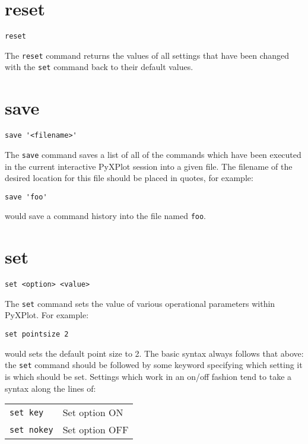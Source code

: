 \section{reset}

\begin{verbatim}
reset
\end{verbatim}

The {\tt reset} command returns the values of all settings that have been
changed with the {\tt set} command back to their default values.


\section{save}

\begin{verbatim}
save '<filename>'
\end{verbatim}

The {\tt save} command saves a list of all of the commands which have been
executed in the current interactive PyXPlot session into a given file. The
filename of the desired location for this file should be placed in quotes, for
example:

\begin{verbatim}
save 'foo'
\end{verbatim}

\noindent would save a command history into the file named {\tt foo}.


\section{set}

\begin{verbatim}
set <option> <value>
\end{verbatim}

The {\tt set} command sets the value of various operational parameters within
PyXPlot.  For example:

\begin{verbatim}
set pointsize 2
\end{verbatim}

\noindent would sets the default point size to 2. The basic syntax always
follows that above: the {\tt set} command should be followed by some keyword
specifying which setting it is which should be set.  Settings which work in an
on/off fashion tend to take a syntax along the lines of:

\begin{tabular}{ll}
{\tt set key} & Set option ON \\
{\tt set nokey} & Set option OFF
\end{tabular}

